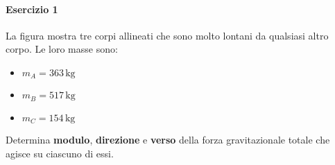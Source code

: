 \paragraph{Esercizio 1}
La figura mostra tre corpi allineati che sono molto lontani da qualsiasi altro corpo. Le loro masse 
sono:
\begin{itemize}[label={$\bullet$}]
	\item $m_A = 363\,\text{kg}$
	\item $m_B = 517\,\text{kg}$
	\item $m_C = 154\,\text{kg}$
\end{itemize}
Determina \textbf{modulo}, \textbf{direzione} e \textbf{verso} della forza gravitazionale totale 
che agisce su ciascuno di essi.
\begin{center}
\end{center}
\divisor

